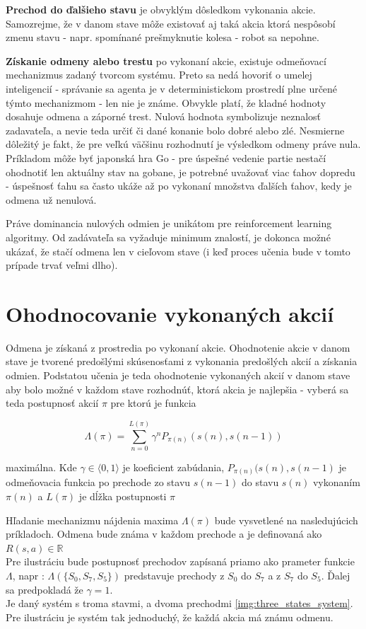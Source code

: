 {\bf Prechod do ďalšieho stavu} je obvyklým dôsledkom vykonania akcie. Samozrejme, že
v danom stave môže existovať aj taká akcia ktorá nespôsobí zmenu stavu - napr. spomínané
prešmyknutie kolesa - robot sa nepohne.

{\bf Získanie odmeny alebo trestu} po vykonaní akcie, existuje odmeňovací mechanizmus
zadaný tvorcom systému. Preto sa nedá hovoriť o umelej inteligencií - správanie
sa agenta je v deterministickom prostredí plne určené týmto mechanizmom - len nie je známe.
Obvykle platí, že kladné hodnoty dosahuje odmena a záporné trest. Nulová hodnota symbolizuje
neznalosť zadavateľa, a nevie teda určiť či dané konanie bolo dobré alebo zlé.
Nesmierne dôležitý je fakt, že pre veľkú väčšinu rozhodnutí je výsledkom odmeny práve nula.
Príkladom môže byť japonská hra Go - pre úspešné vedenie partie nestačí ohodnotiť
len aktuálny stav na gobane, je potrebné uvažovať viac ťahov dopredu - úspešnosť
ťahu sa často ukáže až po vykonaní množstva ďalších ťahov, kedy je odmena už nenulová.

Práve dominancia nulových odmien je unikátom pre reinforcement learning algoritmy.
Od zadávateľa sa vyžaduje minimum znalostí, je dokonca možné ukázať, že stačí
odmena len v cieľovom stave (i keď proces učenia bude v tomto prípade trvať veľmi dlho).


\section{Ohodnocovanie vykonaných akcií}

Odmena je získaná z prostredia po vykonaní akcie. Ohodnotenie akcie v danom stave
je tvorené predošlými skúsenosťami z vykonania predošlých akcií a získania odmien.
Podstatou učenia je teda ohodnotenie vykonaných akcií v danom stave aby bolo
možné v každom stave rozhodnúť, ktorá akcia je najlepšia - vyberá sa teda
postupnosť akcií $\pi$ pre ktorú je funkcia

\begin{equation}
\Lambda(\pi)  = \sum\limits_{n=0}^{L(\pi)}\gamma^n P_{\pi(n)}(s(n), s(n-1))
\label{eq:q_quality}
\end{equation}

maximálna. Kde $\gamma \in \langle 0, 1 \rangle$ je koeficient zabúdania, $P_{\pi(n)}{(s(n), s(n-1)}$
je odmeňovacia funkcia po prechode zo stavu $s(n-1)$ do stavu $s(n)$ vykonaním $\pi(n)$ a
$L(\pi)$ je dĺžka postupnosti $\pi$

Hľadanie mechanizmu nájdenia maxima $\Lambda(\pi)$ bude vysvetlené na nasledujúcich príkladoch.
Odmena bude známa v každom prechode a je definovaná ako $R(s, a) \in \mathbb{R}$
\\
Pre ilustráciu bude postupnosť prechodov zapísaná priamo ako prameter funkcie $\Lambda$, napr :
$\Lambda(\{S_0, S_7, S_5\})$ predstavuje prechody z $S_0$ do $S_7$ a z $S_7$ do $S_5$.
Ďalej sa predpokladá že $\gamma = 1$.
\\
Je daný systém s troma stavmi, a dvoma prechodmi \ref{img:three_states_system}.
Pre ilustráciu je systém tak jednoduchý, že každá akcia má známu odmenu.

